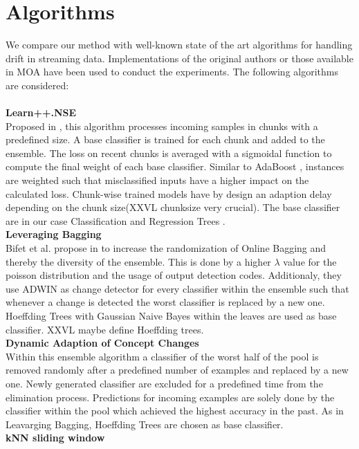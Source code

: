 \documentclass[conference]{IEEEtran}
\begin{document}
\section{Algorithms}
We compare our method with well-known state of the art algorithms for handling drift in streaming data. Implementations of the original authors or those available in MOA \cite{bifet2010moa}
have been used to conduct the experiments. The following algorithms are considered:\\
\\\textbf{Learn++.NSE}\\
Proposed in \cite{5975223}, this algorithm processes incoming samples in chunks with a predefined size. A base classifier is trained for each chunk and added to the ensemble. The loss on recent chunks is averaged with a sigmoidal function
to compute the final weight of each base classifier. Similar to AdaBoost \cite{XXVL}, instances are weighted such that misclassified inputs have a higher impact on the calculated loss.
Chunk-wise trained models have by design an adaption delay depending on the chunk size(XXVL chunksize very crucial). The base classifier are in our case Classification and Regression Trees \cite{cart84}.
\\\textbf{Leveraging Bagging}\\
Bifet et al. propose in \cite{bifet2010leveraging} to increase the randomization of Online Bagging \cite{oza2005online} and thereby the diversity of the ensemble.
This is done by a higher $\lambda$ value for the poisson distribution and the usage of output detection codes. Additionaly, they use ADWIN as change detector for every classifier within the ensemble such that whenever a change is detected 
the worst classifier is replaced by a new one. Hoeffding Trees\cite{domingos2000mining} with Gaussian Naive Bayes within the leaves are used as base classifier.
XXVL maybe define Hoeffding trees.
\\\textbf{Dynamic Adaption of Concept Changes}\\
Within this ensemble algorithm \cite{jaber2013online} a classifier of the worst half of the pool is removed randomly after a predefined number of examples and replaced by a new one. 
Newly generated classifier are excluded for a predefined time from the elimination process. Predictions for incoming examples are solely done by the classifier within the pool which
achieved the highest accuracy in the past. As in Leavarging Bagging, Hoeffding Trees are chosen as base classifier.
\\\textbf{kNN sliding window}\\
\end{document}
